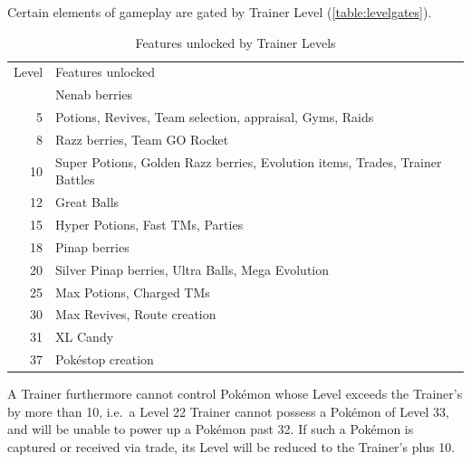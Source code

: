 Certain elements of gameplay are gated by Trainer Level (\autoref{table:levelgates}).
\begin{table}[ht]
\begin{center}
  \begin{tabular}{r p{}}
  Level & Features unlocked \\
\Midrule
  2 & Nenab berries \\
  5 & Potions, Revives, Team selection, appraisal, Gyms, Raids \\
  8 & Razz berries, Team GO Rocket \\
  10 & Super Potions, Golden Razz berries, Evolution items, Trades, Trainer Battles \\
  12 & Great Balls \\
  15 & Hyper Potions, Fast TMs, Parties \\
  18 & Pinap berries \\
  20 & Silver Pinap berries, Ultra Balls, Mega Evolution \\
  25 & Max Potions, Charged TMs \\
  30 & Max Revives, Route creation \\
  31 & XL Candy \\
  37 & Pokéstop creation \\
\end{tabular}
\caption{Features unlocked by Trainer Levels}
\label{table:levelgates}
\end{center}
\end{table}
A Trainer furthermore cannot control Pokémon whose Level exceeds the Trainer's
  by more than 10, i.e.\ a Level 22 Trainer cannot possess a Pokémon of Level 33,
  and will be unable to power up a Pokémon past 32.
If such a Pokémon is captured or received via trade, its Level will be
  reduced to the Trainer's plus 10.

